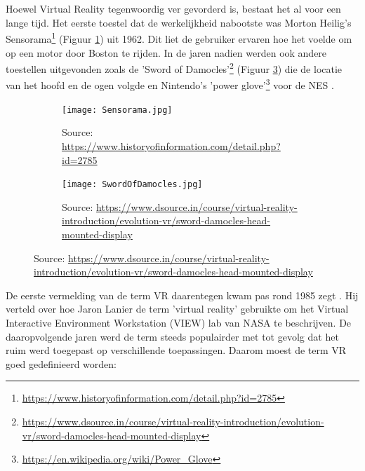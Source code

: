 \section{}%
Hoewel Virtual Reality tegenwoordig ver gevorderd is, bestaat het al voor een lange tijd. Het eerste toestel dat de werkelijkheid nabootste was Morton Heilig’s Sensorama\footnote{\href{https://www.historyofinformation.com/detail.php?id=2785}{https://www.historyofinformation.com/detail.php?id=2785}} (Figuur \ref{fig:Sensorama}) uit 1962. Dit liet de gebruiker ervaren hoe het voelde om op een motor door Boston te rijden. In de jaren nadien werden ook andere toestellen uitgevonden zoals de 'Sword of Damocles'\footnote{\href{https://www.dsource.in/course/virtual-reality-introduction/evolution-vr/sword-damocles-head-mounted-display}{https://www.dsource.in/course/virtual-reality-introduction/evolution-vr/sword-damocles-head-mounted-display}} (Figuur \ref{fig:SwordOfDamocles}) die de locatie van het hoofd en de ogen volgde en Nintendo's 'power glove'\footnote{\href{https://en.wikipedia.org/wiki/Power_Glove}{https://en.wikipedia.org/wiki/Power\_Glove}} voor de NES \autocite{Boas2012}.

\begin{figure}
    \begin{subfigure}{.5\textwidth}
        \centering
        \texttt{[image: Sensorama.jpg]}
        \caption{The Sensorama machine}
        \caption*{Source: \href{https://www.historyofinformation.com/detail.php?id=2785}{https://www.historyofinformation.com/detail.php?id=2785}}
        \label{fig:Sensorama}
    \end{subfigure}%
    \begin{subfigure}{.5\textwidth}
        \centering
        \texttt{[image: SwordOfDamocles.jpg]}
        \caption{Ivan Sutherland's first VR Head Mounted Display, The Sword of Damocles}
        \caption*{Source: \href{https://www.dsource.in/course/virtual-reality-introduction/evolution-vr/sword-damocles-head-mounted-display}{https://www.dsource.in/course/virtual-reality-introduction/evolution-vr/sword-damocles-head-mounted-display}}
        \label{fig:SwordOfDamocles}
    \end{subfigure}
\end{figure}

De eerste vermelding van de term VR daarentegen kwam pas rond 1985 zegt \textcite{Bryson2013}. Hij verteld over hoe Jaron Lanier de term 'virtual reality' gebruikte om het Virtual Interactive Environment Workstation (VIEW) lab van NASA te beschrijven. De daaropvolgende jaren werd de term steeds populairder met tot gevolg dat het ruim werd toegepast op verschillende toepassingen. Daarom moest de term VR goed gedefinieerd worden:

